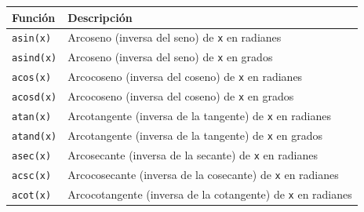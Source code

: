 \documentclass[
  a4paper,
]{scrreport}
\theoremstyle{definition}
\theoremstyle{remark}
\begin{document}
\begin{longtable}[]{@{}
  >{\raggedright\arraybackslash}p{}
  >{\raggedright\arraybackslash}p{}@{}}
\toprule\noalign{}
\begin{minipage}[b]{\linewidth}\raggedright
Función
\end{minipage} & \begin{minipage}[b]{\linewidth}\raggedright
Descripción
\end{minipage} \\
\midrule\noalign{}
\endhead
\bottomrule\noalign{}
\endlastfoot
\texttt{asin(x)} & Arcoseno (inversa del seno) de \texttt{x} en
radianes \\
\texttt{asind(x)} & Arcoseno (inversa del seno) de \texttt{x} en
grados \\
\texttt{acos(x)} & Arcocoseno (inversa del coseno) de \texttt{x} en
radianes \\
\texttt{acosd(x)} & Arcocoseno (inversa del coseno) de \texttt{x} en
grados \\
\texttt{atan(x)} & Arcotangente (inversa de la tangente) de \texttt{x}
en radianes \\
\texttt{atand(x)} & Arcotangente (inversa de la tangente) de \texttt{x}
en grados \\
\texttt{asec(x)} & Arcosecante (inversa de la secante) de \texttt{x} en
radianes \\
\texttt{acsc(x)} & Arcocosecante (inversa de la cosecante) de \texttt{x}
en radianes \\
\texttt{acot(x)} & Arcocotangente (inversa de la cotangente) de
\texttt{x} en radianes \\
\end{longtable}
\end{document}
